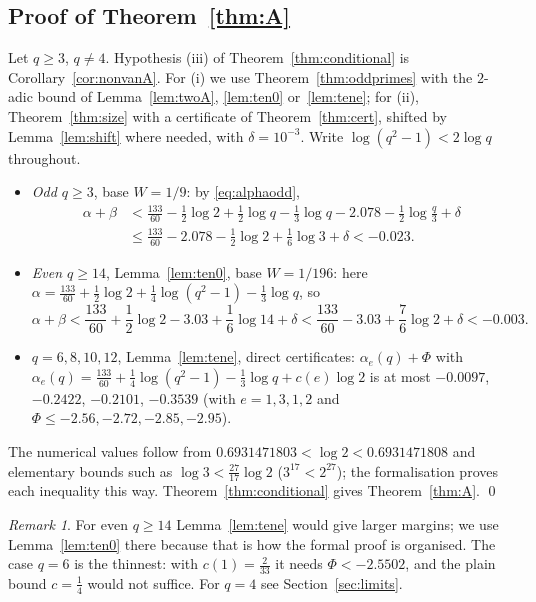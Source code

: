 \documentclass[11pt]{amsart}
\theoremstyle{definition}
\theoremstyle{remark}
\newtheorem{remark}[theorem]{Remark}
\numberwithin{equation}{section}
\begin{document}
\subsection{Proof of Theorem~\ref{thm:A}}
Let $q\ge3$, $q\ne4$. Hypothesis (iii) of Theorem~\ref{thm:conditional} is Corollary~\ref{cor:nonvanA}. For (i) we use
Theorem~\ref{thm:oddprimes} with the $2$-adic bound of Lemma~\ref{lem:twoA}, \ref{lem:ten0} or~\ref{lem:tene}; for (ii),
Theorem~\ref{thm:size} with a certificate of Theorem~\ref{thm:cert}, shifted by Lemma~\ref{lem:shift} where needed, with
$\delta=10^{-3}$. Write $\log(q^2-1)<2\log q$ throughout.
\begin{itemize}
\item \emph{Odd $q\ge3$}, base $W=1/9$: by \eqref{eq:alphaodd},
  \begin{align*}
    \alpha+\beta&<\frac{133}{60}-\frac12\log2+\frac12\log q-\frac13\log q-2.078-\frac12\log\frac q3+\delta\\
    &\le\frac{133}{60}-2.078-\frac12\log2+\frac16\log3+\delta<-0.023 .
  \end{align*}
\item \emph{Even $q\ge14$}, Lemma~\ref{lem:ten0}, base $W=1/196$: here
  $\alpha=\frac{133}{60}+\frac12\log2+\frac14\log(q^2-1)-\frac13\log q$, so
  \[
    \alpha+\beta<\frac{133}{60}+\frac12\log2-3.03+\frac16\log14+\delta<\frac{133}{60}-3.03+\frac76\log2+\delta<-0.003.
  \]
\item \emph{$q=6,8,10,12$}, Lemma~\ref{lem:tene}, direct certificates: $\alpha_e(q)+\Phi$ with
  $\alpha_e(q)=\frac{133}{60}+\frac14\log(q^2-1)-\frac13\log q+c(e)\log2$ is at most $-0.0097$, $-0.2422$, $-0.2101$, $-0.3539$
  (with $e=1,3,1,2$ and $\Phi\le-2.56,-2.72,-2.85,-2.95$).
\end{itemize}
The numerical values follow from $0.6931471803<\log2<0.6931471808$ and elementary bounds such as $\log3<\frac{27}{17}\log2$
($3^{17}<2^{27}$); the formalisation proves each inequality this way. Theorem~\ref{thm:conditional} gives
Theorem~\ref{thm:A}. \qed

\begin{remark}
For even $q\ge14$ Lemma~\ref{lem:tene} would give larger margins; we use Lemma~\ref{lem:ten0} there because that is how
the formal proof is organised. The case $q=6$ is the thinnest: with $c(1)=\frac2{33}$ it needs $\Phi<-2.5502$, and the
plain bound $c=\frac14$ would not suffice. For $q=4$ see Section~\ref{sec:limits}.
\end{remark}

\end{document}
